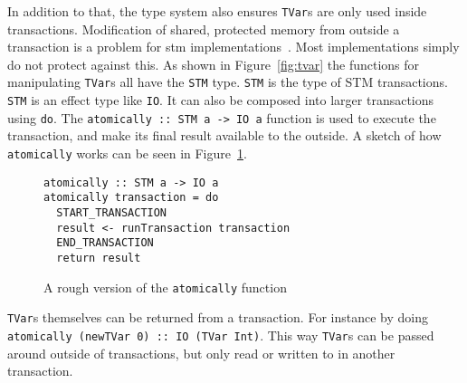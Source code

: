 In addition to that, the type system also ensures \texttt{TVar}s are only used
inside transactions. Modification of shared, protected memory from outside a
transaction is a problem for stm implementations~\cite{research-toy}. Most
implementations simply do not protect against this. As shown in
Figure~\ref{fig:tvar} the functions for manipulating \texttt{TVar}s all have the
\texttt{STM} type. \texttt{STM} is the type of STM transactions. \texttt{STM} is
an effect type like \texttt{IO}. It can also be composed into larger
transactions using \texttt{do}. The \texttt{atomically :: STM a -> IO a}
function is used to execute the transaction, and make its final result available
to the outside. A sketch of how \texttt{atomically} works can be seen in
Figure~\ref{fig:atomically}.

\begin{figure}
  \begin{lstlisting}
atomically :: STM a -> IO a
atomically transaction = do
  START_TRANSACTION
  result <- runTransaction transaction
  END_TRANSACTION
  return result
  \end{lstlisting}
  \caption{A rough version of the \texttt{atomically} function}
  \label{fig:atomically}
\end{figure}

\texttt{TVar}s themselves can be returned from a transaction. For instance by
doing \texttt{atomically (newTVar 0) :: IO (TVar Int)}. This way \texttt{TVar}s
can be passed around outside of transactions, but only read or written to in
another transaction.

